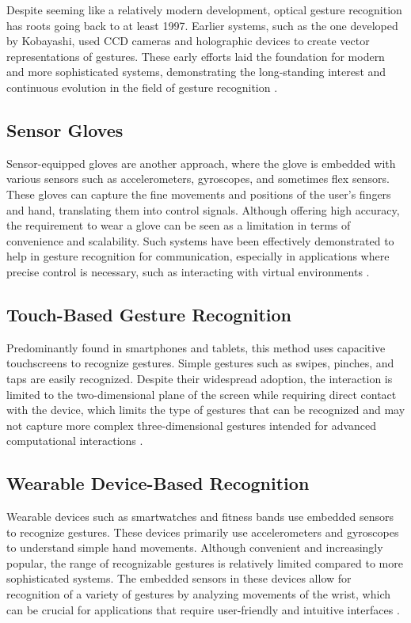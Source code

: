 Despite seeming like a relatively modern development, optical gesture recognition has roots going back to at least 1997. Earlier systems, such as the one developed by Kobayashi, used CCD cameras and holographic devices to create vector representations of gestures. These early efforts laid the foundation for modern and more sophisticated systems, demonstrating the long-standing interest and continuous evolution in the field of gesture recognition \cite{kobayashi1997optical}.

\subsection{Sensor Gloves}
Sensor-equipped gloves are another approach, where the glove is embedded with various sensors such as accelerometers, gyroscopes, and sometimes flex sensors. These gloves can capture the fine movements and positions of the user's fingers and hand, translating them into control signals. Although offering high accuracy, the requirement to wear a glove can be seen as a limitation in terms of convenience and scalability. Such systems have been effectively demonstrated to help in gesture recognition for communication, especially in applications where precise control is necessary, such as interacting with virtual environments \cite{preetham2013hand}.

\subsection{Touch-Based Gesture Recognition}
Predominantly found in smartphones and tablets, this method uses capacitive touchscreens to recognize gestures. Simple gestures such as swipes, pinches, and taps are easily recognized. Despite their widespread adoption, the interaction is limited to the two-dimensional plane of the screen while requiring direct contact with the device, which limits the type of gestures that can be recognized and may not capture more complex three-dimensional gestures intended for advanced computational interactions \cite{panella2019smartphone}.

\subsection{Wearable Device-Based Recognition}
Wearable devices such as smartwatches and fitness bands use embedded sensors to recognize gestures. These devices primarily use accelerometers and gyroscopes to understand simple hand movements. Although convenient and increasingly popular, the range of recognizable gestures is relatively limited compared to more sophisticated systems. The embedded sensors in these devices allow for recognition of a variety of gestures by analyzing movements of the wrist, which can be crucial for applications that require user-friendly and intuitive interfaces \cite{xu2015finger}.

